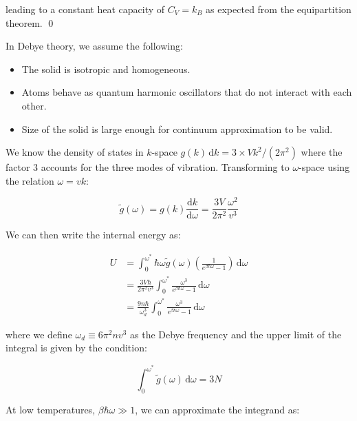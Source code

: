 \documentclass[12pt]{article}
\begin{document}
leading to a constant heat capacity of $C_{V} = k_{B}$ as expected from the equipartition theorem.
\qed




In Debye theory, we assume the following:

\begin{itemize}
    \item The solid is isotropic and homogeneous.
    \item Atoms behave as quantum harmonic oscillators that do not interact with each other.
    \item Size of the solid is large enough for continuum approximation to be valid.
\end{itemize}

We know the density of states in $k$-space $g(k) \, \mathrm{d}k = 3 \times Vk^{2}/(2\pi^{2})$ where the factor $3$ accounts for the three modes of vibration. Transforming to $\omega$-space using the relation $\omega = vk$:

\begin{equation}
    \tilde{g}(\omega) = g(k) \frac{\mathrm{d}k}{\mathrm{d}\omega} = \frac{3V}{2\pi^{2}} \frac{\omega^{2}}{v^{3}}
\end{equation}

We can then write the internal energy as:

\begin{equation}
    \begin{split}
        U &= \int_{0}^{\omega^{*}} \hbar \omega \tilde{g}(\omega) \left( \frac{1}{e^{\beta \hbar \omega} - 1} \right) \, \mathrm{d}\omega \\
        &= \frac{3V\hbar}{2\pi^{2}v^{3}} \int_{0}^{\omega^{*}} \frac{\omega^{3}}{e^{\beta \hbar \omega} - 1} \, \mathrm{d}\omega \\
        &= \frac{9n\hbar}{\omega_{d}^{3}} \int_{0}^{\omega^{*}} \frac{\omega^{3}}{e^{\beta \hbar \omega} - 1} \, \mathrm{d}\omega
    \end{split}
\end{equation}

where we define $\omega_{d} \equiv 6\pi^{2}nv^{3}$ as the Debye frequency and the upper limit of the integral is given by the condition:

\begin{equation}
    \int_{0}^{\omega^{*}} \tilde{g}(\omega) \, \mathrm{d}\omega = 3N
\end{equation}

At low temperatures, $\beta \hbar \omega \gg 1$, we can approximate the integrand as:
\end{document}

